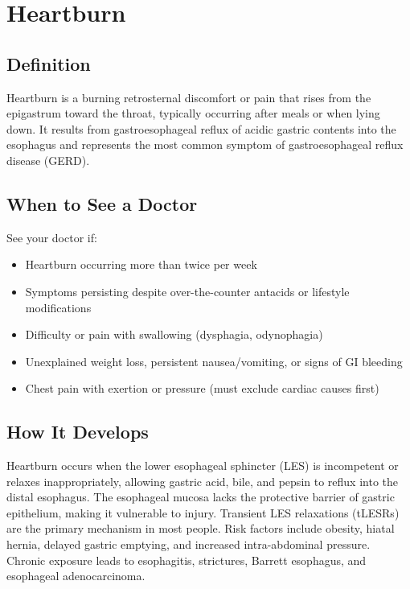 \chapter{Heartburn}

\section*{Definition}
Heartburn is a burning retrosternal discomfort or pain that rises from the epigastrum toward the throat, typically occurring after meals or when lying down. It results from gastroesophageal reflux of acidic gastric contents into the esophagus and represents the most common symptom of gastroesophageal reflux disease (GERD).

\section*{When to See a Doctor}
See your doctor if:
\begin{itemize}
  \item Heartburn occurring more than twice per week
  \item Symptoms persisting despite over-the-counter antacids or lifestyle modifications
  \item Difficulty or pain with swallowing (dysphagia, odynophagia)
  \item Unexplained weight loss, persistent nausea/vomiting, or signs of GI bleeding
  \item Chest pain with exertion or pressure (must exclude cardiac causes first)
\end{itemize}

\section*{How It Develops}
Heartburn occurs when the lower esophageal sphincter (LES) is incompetent or relaxes inappropriately, allowing gastric acid, bile, and pepsin to reflux into the distal esophagus. The esophageal mucosa lacks the protective barrier of gastric epithelium, making it vulnerable to injury. Transient LES relaxations (tLESRs) are the primary mechanism in most people. Risk factors include obesity, hiatal hernia, delayed gastric emptying, and increased intra-abdominal pressure. Chronic exposure leads to esophagitis, strictures, Barrett esophagus, and esophageal adenocarcinoma.

